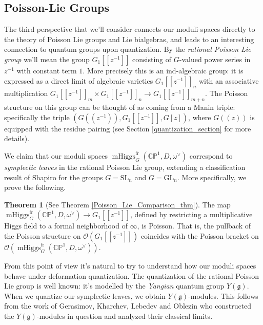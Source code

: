 \documentclass[11pt, oneside, reqno]{amsart}
\theoremstyle{definition} \newtheorem{definition}{Definition}[section]
\newtheorem{theorem}[definition]{Theorem}
\theoremstyle{definition} \newtheorem{remark}[definition]{Remark}
\theoremstyle{definition} \newtheorem{remarks}[definition]{Remarks}
\theoremstyle{definition} \newtheorem{question}[definition]{Question}
\theoremstyle{definition} \newtheorem*{note}{Note}
\theoremstyle{definition} \newtheorem{example}[definition]{Example}
\theoremstyle{definition} \newtheorem{examples}[definition]{Examples}
\renewcommand{\gg}{\mathfrak{g}}
\newcommand{\bb}[1]{\mathbb{#1}}
\newcommand{\OO}{\mathcal{O}}
\newcommand{\SL}{\mathrm{SL}}
\newcommand{\GL}{\mathrm{GL}}
\DeclareMathOperator{\mhiggs}{mHiggs}
\newcommand{\fr}{\mathrm{fr}}
\begin{document}
\subsection{Poisson-Lie Groups}
The third perspective that we'll consider connects our moduli spaces directly to the theory of Poisson Lie groups and Lie bialgebras, and leads to an interesting connection to quantum groups upon quantization.  By the \emph{rational Poisson Lie group} we'll mean the group $G_1[[z^{-1}]]$ consisting of $G$-valued power series in $z^{-1}$ with constant term $1$.  More precisely this is an ind-algebraic group: it is expressed as a direct limit of algebraic varieties $G_1[[z^{-1}]]_n$ with an associative multiplication $G_1[[z^{-1}]]_m \times G_1[[z^{-1}]]_n \to G_1[[z^{-1}]]_{m+n}$.  The Poisson structure on this group can be thought of as coming from a Manin triple: specifically the triple $(G(\!(z^{-1})\!), G_1[[z^{-1}]], G[z])$, where $G(\!(z)\!)$ is equipped with the residue pairing (see Section \ref{quantization_section} for more details).  

We claim that our moduli spaces $\mhiggs_G^{\text{fr}}(\bb{CP}^1,D,\omega^\vee)$ correspond to \emph{symplectic leaves} in the rational Poisson Lie group, extending a classification result of Shapiro \cite{Shapiro} for the groups $G = \SL_n$ and $G = \GL_n$.  More specifically, we prove the following.
\begin{theorem}[See Theorem \ref{Poisson_Lie_Comparison_thm}]
The map $\mhiggs^\fr_G(\bb{CP}^1,D,\omega^\vee) \to G_1[[z^{-1}]]$, defined by restricting a multiplicative Higgs field to a formal neighborhood of $\infty$, is Poisson.  That is, the pullback of the Poisson structure on $\OO(G_1[[z^{-1}]])$ coincides with the Poisson bracket on $\OO(\mhiggs^\fr_G(\bb{CP}^1,D,\omega^\vee))$. 
\end{theorem}

From this point of view it's natural to try to understand how our moduli spaces behave under deformation quantization.  The quantization of the rational Poisson Lie group is well known: it's modelled by the \emph{Yangian} quantum group $Y(\gg)$.  When we quantize our symplectic leaves, we obtain $Y(\gg)$-modules.  This follows from the work of Gerasimov, Kharchev, Lebedev and Oblezin \cite{GKLO} who constructed the $Y(\gg)$-modules in question and analyzed their classical limits.
\end{document}

